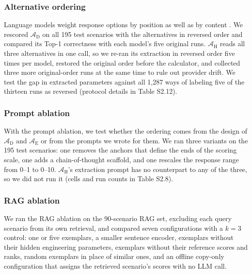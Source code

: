 \documentclass[final,3p,times]{elsarticle}
\begin{document}
\subsubsection{Alternative ordering}
\label{sec:alternative-order}
Language models weight response options by position as well as by content \cite{wang2024fairescalers,zheng2023judging}. We rescored $\mathcal{A}_{\text{D}}$ on all 195 test scenarios with the alternatives in reversed order and compared its Top-1 correctness with each model's five original runs. $\mathcal{A}_{\text{H}}$ reads all three alternatives in one call, so we re-ran its extraction in reversed order five times per model, restored the original order before the calculator, and collected three more original-order runs at the same time to rule out provider drift. We test the gap in extracted parameters against all 1,287 ways of labeling five of the thirteen runs as reversed (protocol details in Table S2.12).

\subsubsection{Prompt ablation}
\label{sec:prompt-ablation-methods}
With the prompt ablation, we test whether the ordering comes from the design of $\mathcal{A}_{\text{D}}$ and $\mathcal{A}_{\text{E}}$ or from the prompts we wrote for them. We ran three variants on the 195 test scenarios: one removes the anchors that define the ends of the scoring scale, one adds a chain-of-thought scaffold, and one rescales the response range from 0--1 to 0--10. $\mathcal{A}_{\text{H}}$'s extraction prompt has no counterpart to any of the three, so we did not run it (cells and run counts in Table S2.8).

\subsubsection{RAG ablation}
\label{sec:rag-ablation-methods}
We ran the RAG ablation on the 90-scenario RAG set, excluding each query scenario from its own retrieval, and compared seven configurations with a $k=3$ control: one or five exemplars, a smaller sentence encoder, exemplars without their hidden engineering parameters, exemplars without their reference scores and ranks, random exemplars in place of similar ones, and an offline copy-only configuration that assigns the retrieved scenario's scores with no LLM call.
\end{document}
